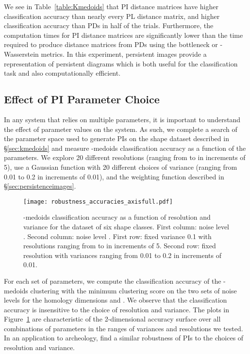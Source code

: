 \documentclass[11pt]{article}
\begin{document}
We see in Table~\ref{table:Kmedoids} that PI distance matrices have higher classification accuracy than nearly every PL distance matrix, and higher classification accuracy than PDs in half of the trials. Furthermore, the computation times for PI distance matrices are significantly lower than the time required to produce distance matrices from PDs using the bottleneck or -Wasserstein metrics. In this experiment, persistent images provide a representation of persistent diagrams which is both useful for the classification task and also computationally efficient. 



\subsection{Effect of PI Parameter Choice}
\label{subsec:param_selection}




In any system that relies on multiple parameters, it is important to understand the effect of parameter values on the system. As such, we complete a search of the parameter space used to generate PIs on the shape dataset described in \S\ref{sec:kmedoids} and measure -medoids classification accuracy as a function of the parameters. We explore 20 different resolutions (ranging from  to  in increments of 5), use a Gaussian function with 20 different choices of variance (ranging from 0.01 to 0.2 in increments of 0.01), and the weighting function described in \S\ref{sec:persistenceimages}.
\begin{figure}[h]
\captionsetup[subfigure]{justification=centering}
\centering
\texttt{[image: robustness\_accuracies\_axisfull.pdf]}
\caption{-medoids classification accuracy as a function of resolution and variance for the dataset of six shape classes. First column: noise level . Second column: noise level . First row: fixed variance 0.1 with resolutions ranging from  to  in increments of 5. Second row: fixed resolution  with variances ranging from 0.01 to 0.2 in increments of 0.01. 
}
\label{fig:Clustering_kmed}
\end{figure}
For each set of parameters, we compute the classification accuracy of the -medoids clustering with the minimum clustering score on the two sets of noise levels for the homology dimensions  and . We observe that the classification accuracy is insensitive to the choice of resolution and variance. The plots in Figure~\ref{fig:Clustering_kmed} are characteristic of the 2-dimensional accuracy surface over all combinations of parameters in the ranges of variances and resolutions we tested. In an application to archeology, \citet{zeppelzauer2016topological} find a similar robustness of PIs to the choices of resolution and variance.
\end{document}
